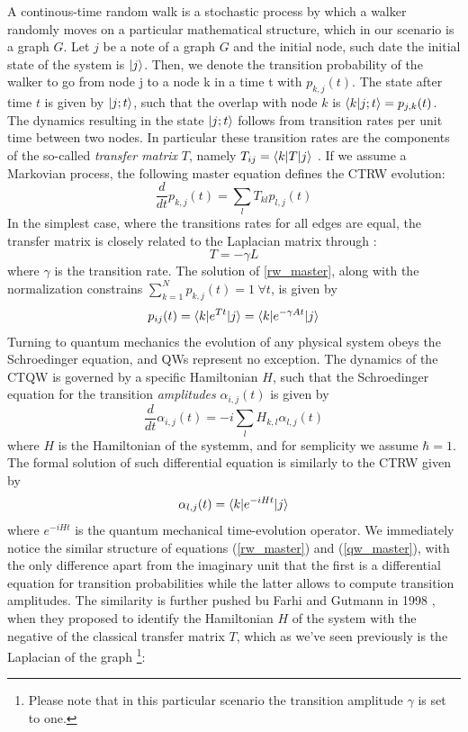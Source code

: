 A continous-time random walk is a stochastic process by which a walker randomly moves on a particular mathematical structure, which in our scenario is a graph $G$.
Let $j$ be a note of a graph $G$ and the initial node, such date the initial state of the system is ${|{j}\rangle}$. Then, we denote the transition probability of the walker to go from node j to a node k in a time t with $p_{k,j}(t)$. The state after time $t$ is given by ${|{j;t}\rangle}$, such that the overlap with node $k$ is $\braket{k|j;t}=p_{j,k}(t)$. \\
The dynamics resulting in the state ${|{j;t}\rangle}$ follows from transition rates per unit time between two nodes. In particular these transition rates are the components of the so-called \textit{transfer matrix} $T$, namely $T_{ij}= {\langle{k}|}T{|{j}\rangle}$ . If we assume a Markovian process, the following master equation defines the CTRW evolution:
\begin{equation}
  \frac{d}{dt}p_{k,j}(t) = \sum_{l}T_{kl}p_{l,j}(t)
  \label{rw_master}
\end{equation}
In the simplest case, where the transitions rates for all edges are equal, the transfer matrix is closely related to the Laplacian matrix through :
\begin{equation}
  T = -\gamma L
\end{equation}
where $\gamma$ is the transition rate. The solution of \cref{rw_master}, along with the normalization constrains $\sum_{k=1}^{N}p_{k,j}(t) = 1 \hspace{3pt} \forall t$, is given by
\begin{equation}
  p_{ij}(t)= \braket{k|e^{Tt}|j} = \braket{k|e^{-\gamma At}|j}
\end{equation}
Turning to quantum mechanics the evolution of any physical system obeys the Schroedinger equation, and QWs represent no exception. The dynamics of the CTQW is governed by a specific Hamiltonian $H$, such that the Schroedinger equation for the transition \textit{amplitudes} $\alpha_{i,j}(t)$ is given by
\begin{equation}
  \frac{d}{dt}\alpha_{i,j}(t) = -i \sum_{l}H_{k,l}\alpha_{l,j}(t)
\end{equation}
where $H$ is the Hamiltonian of the systemm, and for semplicity we assume $\hbar = 1$. The formal solution of such differential equation is similarly to the CTRW given by
\begin{equation}
  \alpha_{l,j}(t) = \braket{k|e^{-iHt}|j}
  \label{qw_master}
\end{equation}
where $e^{-iHt}$ is the quantum mechanical time-evolution operator. We immediately notice the similar structure of equations (\ref{rw_master}) and (\ref{qw_master}), with the only difference apart from the imaginary unit  that the first is a differential equation for transition probabilities while the latter allows to compute transition amplitudes. The similarity is further pushed bu Farhi and Gutmann in 1998 \cite{Childs2001}, when they proposed to identify the Hamiltonian $H$ of the system with the negative of the classical transfer matrix $T$, which as we've seen previously is the Laplacian of the graph \footnote{Please note that in this particular scenario the transition amplitude $\gamma$ is set to one.}:
